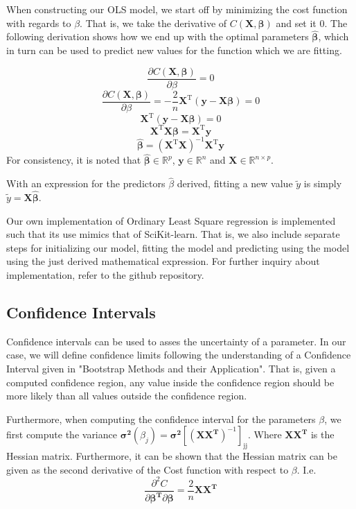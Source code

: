 \documentclass[11pt, a4paper]{article}
\begin{document}
When constructing our OLS model, we start off by minimizing the cost function with regards to $\beta$. That is, we take the derivative of $C(\bm{X},\bm{\beta})$ and set it $0$. The following derivation shows how we end up with the optimal parameters $\bm{\hat{\beta}}$, which in turn can be used to predict new values for the function which we are fitting.

\[
  \frac{\partial{C(\boldsymbol{X},\boldsymbol{\beta})}}{\partial{\beta}} = 0
\]
\[
  \frac{\partial{C(\boldsymbol{X},\boldsymbol{\beta})}}{\partial{\beta}} = -\frac{2}{n}\bm{X}^\text{T}\left(\bm{y} - \bm{X}\bm{\beta}\right) = 0
\]
\[
  \bm{X}^\text{T}\left(\bm{y} - \bm{X}\bm{\beta}\right) = 0
\]
\[
  \bm{X}^\text{T}\bm{X}\bm{\beta} = \bm{X}^\text{T}\bm{y}
\]
\[
  \bm{\hat{\beta}} = \left(\bm{X}^\text{T}\bm{X}\right)^{-1}\bm{X}^\text{T}\bm{y}
\]
For consistency, it is noted that $\bm{\hat{\beta}} \in \mathbb{R}^p$, $\bm{y} \in \mathbb{R}^n$ and $\bm{X} \in \mathbb{R}^{n\times{p}}$.

With an expression for the predictors $\hat{\beta}$ derived, fitting a new value $\tilde{y}$ is simply $\tilde{y} = \bm{X}\bm{\hat{\beta}}$.

Our own implementation of Ordinary Least Square regression is implemented such that its use mimics that of SciKit-learn. \cite{scikit-learn} That is, we also include separate steps for initializing our model, fitting the model and predicting using the model using the just derived mathematical expression. For further inquiry about implementation, refer to the github repository.

\subsection*{Confidence Intervals}
Confidence intervals can be used to asses the uncertainty of a parameter. In our case, we will define confidence limits following the understanding of a Confidence Interval given in "Bootstrap Methods and their Application". That is, given a computed confidence region, any value inside the confidence region should be more likely than all values outside the confidence region. \cite{Davison1997}

Furthermore, when computing the confidence interval for the parameters $\beta$, we first compute the variance $\bm{\sigma^2}(\beta_j) = \bm{\sigma^2}\left[(\bm{X}\bm{X^\text{T}})^{-1}\right]_\text{jj}$. Where $\bm{X}\bm{X^\text{T}}$ is the Hessian matrix. Furthermore, it can be shown that the Hessian matrix can be given as the second derivative of the Cost function with respect to $\beta$. I.e.
\[
  \frac{\partial^2C}{\partial{\bm{\beta^\text{T}}}\partial{\bm{\beta}}} = \frac{2}{n}\bm{X}\bm{X^\text{T}}
\]
\end{document}
